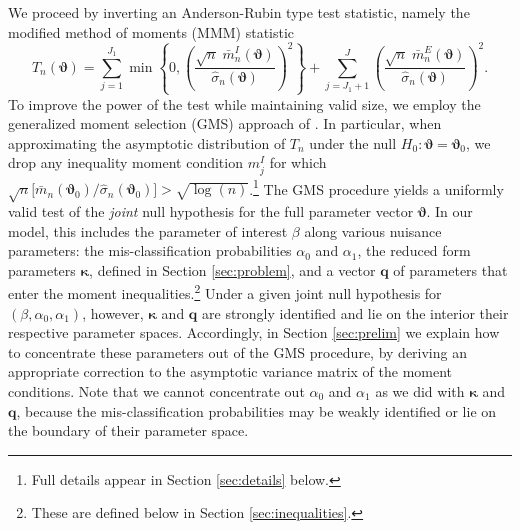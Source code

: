 We proceed by inverting an Anderson-Rubin type test statistic, namely the modified method of moments (MMM) statistic 
\begin{equation}
  T_n(\boldsymbol{\vartheta}) = \sum_{j=1}^{J_1}\min\left\{ 0, \left( \frac{\sqrt{n}\; \bar{m}_n^I(\boldsymbol{\vartheta})}{\widehat{\sigma}_n(\boldsymbol{\vartheta})} \right)^2 \right\} + \sum_{j=J_1 + 1}^{J} \left( \frac{\sqrt{n}\; \bar{m}_n^E(\boldsymbol{\vartheta})}{\widehat{\sigma}_n(\boldsymbol{\vartheta})} \right)^2.
  \label{eq:MMM}
\end{equation}
To improve the power of the test while maintaining valid size, we employ the generalized moment selection (GMS) approach of \cite{AndrewsSoares}.
In particular, when approximating the asymptotic distribution of $T_n$ under the null $H_0\colon \boldsymbol{\vartheta} = \boldsymbol{\vartheta}_0$, we drop any inequality moment condition $m_j^I$ for which $\sqrt{n}\big[\bar{m}_n(\boldsymbol{\vartheta}_0)/ \widehat{\sigma}_n(\boldsymbol{\vartheta}_0)\big] > \sqrt{\log(n)}$.\footnote{Full details appear in Section \ref{sec:details} below.}
The GMS procedure yields a uniformly valid test of the \emph{joint} null hypothesis for the full parameter vector $\boldsymbol{\vartheta}$. 
In our model, this includes the parameter of interest $\beta$ along various nuisance parameters: the mis-classification probabilities $\alpha_0$ and $\alpha_1$, the reduced form parameters $\boldsymbol{\kappa}$, defined in Section \ref{sec:problem}, and a vector $\mathbf{q}$ of parameters that enter the moment inequalities.\footnote{These are defined below in Section \ref{sec:inequalities}.}
Under a given joint null hypothesis for $(\beta, \alpha_0, \alpha_1)$, however, $\boldsymbol{\kappa}$ and $\mathbf{q}$ are strongly identified and lie on the interior their respective parameter spaces. 
Accordingly, in Section \ref{sec:prelim} we explain how to concentrate these parameters out of the GMS procedure, by deriving an appropriate correction to the asymptotic variance matrix of the moment conditions.
Note that we cannot concentrate out $\alpha_0$ and $\alpha_1$ as we did with $\boldsymbol{\kappa}$ and $\mathbf{q}$, because the mis-classification probabilities may be weakly identified or lie on the boundary of their parameter space.

